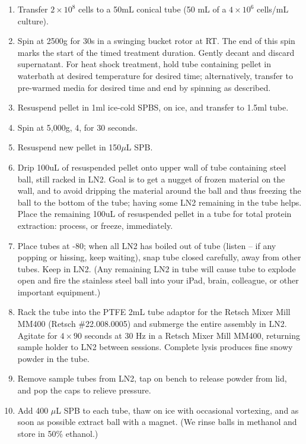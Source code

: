 \documentclass{article}
\newcommand{\mul}{\ensuremath{\mu}L\xspace}
\newcommand{\degC}{\celsius\xspace}
\begin{document}
\begin{enumerate}[resume]
\item Transfer $2 \times 10^8$ cells to a 50mL conical tube (50 mL of a $4 \times 10^6$ cells/mL culture). 
\item Spin at 2500g for 30s in a swinging bucket rotor at RT. The end of this spin marks the start of the timed treatment duration. Gently decant and discard supernatant. For heat shock treatment, hold tube containing pellet in waterbath at desired temperature for desired time; alternatively, transfer to pre-warmed media for desired time and end by spinning as described.

\item Resuspend pellet in 1ml ice-cold SPBS, on ice, and transfer to 1.5ml tube.
\item Spin at 5,000g, 4\degC, for 30 seconds.
\item Resuspend new pellet in 150\mul SPB.
\item \label{step:flashfreeze} 
Drip 100uL of resuspended pellet onto upper wall of tube containing steel ball, still racked in LN2. Goal is to get a nugget of frozen material on the wall, and to avoid dripping the material around the ball and thus freezing the ball to the bottom of the tube; having some LN2 remaining in the tube helps.  Place the remaining 100uL of resuspended pellet in a tube for total protein extraction: process, or freeze, immediately. 
\item Place tubes at -80\degC; when all LN2 has boiled out of tube (listen -- if any popping or hissing, keep waiting), snap tube closed carefully, away from other tubes. Keep in LN2. (Any remaining LN2 in tube will cause tube to explode open and fire the stainless steel ball into your iPad, brain, colleague, or other important equipment.)
\item Rack the tube into the PTFE 2mL tube adaptor for the Retsch Mixer Mill MM400 (Retsch \#22.008.0005) and submerge the entire assembly in LN2.
Agitate for $4\times 90$ seconds at 30 Hz in a Retsch Mixer Mill MM400, returning sample holder to LN2 between sessions. Complete lysis produces fine snowy powder in the tube.
\item  \label{step:powder} 
Remove sample tubes from LN2, tap on bench to release powder from lid, and pop the caps to relieve pressure. 
\item Add 400 \mul SPB to each tube, thaw on ice with occasional vortexing, and as soon as possible extract ball with a magnet. (We rinse balls in methanol and store in 50\% ethanol.)
\end{enumerate}
\end{document}
